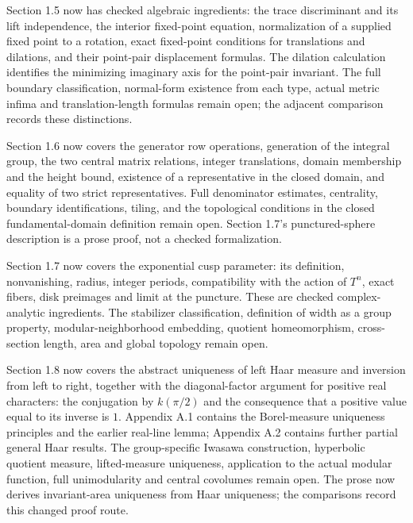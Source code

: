Section 1.5 now has checked algebraic ingredients: the trace discriminant and its lift independence, the interior fixed-point equation, normalization of a supplied fixed point to a rotation, exact fixed-point conditions for translations and dilations, and their point-pair displacement formulas. The dilation calculation identifies the minimizing imaginary axis for the point-pair invariant. The full boundary classification, normal-form existence from each type, actual metric infima and translation-length formulas remain open; the adjacent comparison records these distinctions.

Section 1.6 now covers the generator row operations, generation of the integral group, the two central matrix relations, integer translations, domain membership and the height bound, existence of a representative in the closed domain, and equality of two strict representatives. Full denominator estimates, centrality, boundary identifications, tiling, and the topological conditions in the closed fundamental-domain definition remain open. Section 1.7's punctured-sphere description is a prose proof, not a checked formalization.

Section 1.7 now covers the exponential cusp parameter: its definition, nonvanishing, radius, integer periods, compatibility with the action of $T^n$, exact fibers, disk preimages and limit at the puncture. These are checked complex-analytic ingredients. The stabilizer classification, definition of width as a group property, modular-neighborhood embedding, quotient homeomorphism, cross-section length, area and global topology remain open.

Section 1.8 now covers the abstract uniqueness of left Haar measure and inversion from left to right, together with the diagonal-factor argument for positive real characters: the conjugation by $k(\pi/2)$ and the consequence that a positive value equal to its inverse is $1$. Appendix A.1 contains the Borel-measure uniqueness principles and the earlier real-line lemma; Appendix A.2 contains further partial general Haar results. The group-specific Iwasawa construction, hyperbolic quotient measure, lifted-measure uniqueness, application to the actual modular function, full unimodularity and central covolumes remain open. The prose now derives invariant-area uniqueness from Haar uniqueness; the comparisons record this changed proof route.
